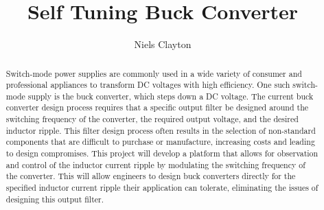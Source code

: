 \documentclass[11pt, a4paper, oneside]{report}
\title{Self Tuning Buck Converter}
\author{Niels Clayton}
\date{}
\begin{document}
\frontmatter


\begin{abstract}

    Switch-mode power supplies are commonly used in a wide variety of consumer and professional appliances to transform DC voltages with high efficiency. One such switch-mode supply is the buck converter, which steps down a DC voltage. The current buck converter design process requires that a specific output filter be designed around the switching frequency of the converter, the required output voltage, and the desired inductor ripple. This filter design process often results in the selection of non-standard components that are difficult to purchase or manufacture, increasing costs and leading to design compromises. This project will develop a platform that allows for observation and control of the inductor current ripple by modulating the switching frequency of the converter. This will allow engineers to design buck converters directly for the specified inductor current ripple their application can tolerate, eliminating the issues of designing this output filter.

\end{abstract}


\maketitle

\setcounter{tocdepth}{1}
\tableofcontents


\mainmatter











\backmatter


\let\OLDthebibliography\thebibliography
\renewcommand\thebibliography[1]{
  \OLDthebibliography{#1}
  \setlength{\parskip}{0pt}
}




% 
\end{document}
